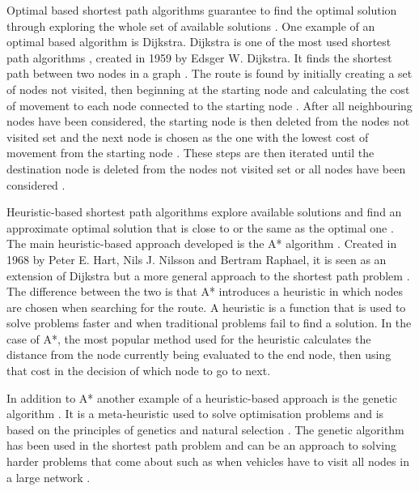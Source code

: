 \documentclass[11pt]{report}
\begin{document}
Optimal based shortest path algorithms guarantee to find the optimal solution through exploring the whole set of available solutions \autocite{nha2012comparative}. One example of an optimal based algorithm is Dijkstra. Dijkstra is one of the most used shortest path algorithms \autocite{broumi2016applying}, created in 1959 by Edsger W. Dijkstra. It finds the shortest path between two nodes in a graph \autocite{dijkstra1959note}. The route is found by initially creating a set of nodes not visited, then beginning at the starting node and calculating the cost of movement to each node connected to the starting node \autocite{pathComparison2012}. After all neighbouring nodes have been considered, the starting node is then deleted from the nodes not visited set and the next node is chosen as the one with the lowest cost of movement from the starting node \autocite{pathComparison2012}. These steps are then iterated until the destination node is deleted from the nodes not visited set or all nodes have been considered \autocite{pathComparison2012}.

Heuristic-based shortest path algorithms explore available solutions and find an approximate optimal solution that is close to or the same as the optimal one \autocite{nha2012comparative}. The main heuristic-based approach developed is the A* algorithm \autocite{hartAStar}. Created in 1968 by Peter E. Hart, Nils J. Nilsson and Bertram Raphael, it is seen as an extension of Dijkstra but a more general approach to the shortest path problem \autocite{pathComparison2012}. The difference between the two is that A* introduces a heuristic in which nodes are chosen when searching for the route. A heuristic is a function that is used to solve problems faster and when traditional problems fail to find a solution. In the case of A*, the most popular method used for the heuristic calculates the distance from the node currently being evaluated to the end node, then using that cost in the decision of which node to go to next.

In addition to A* another example of a heuristic-based approach is the genetic algorithm \autocite{haupt2004practical}. It is a meta-heuristic used to solve optimisation problems and is based on the principles of genetics and natural selection \autocite{bagheri2008finding}\autocite{nha2012comparative}. The genetic algorithm has been used in the shortest path problem and can be an approach to solving harder problems that come about such as when vehicles have to visit all nodes in a large network \autocite{genAlgs1997}.
\end{document}
